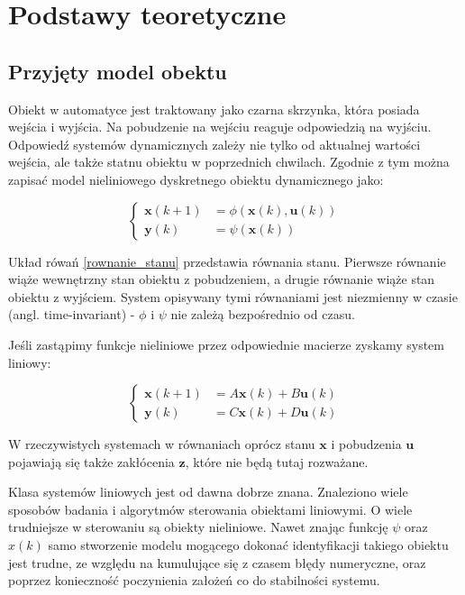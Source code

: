 \documentclass{article}
\newcommand{\bb}{\textbf}
\begin{document}
\section{Podstawy teoretyczne}

\subsection{Przyjęty model obektu}

Obiekt w automatyce jest traktowany jako czarna skrzynka, która posiada wejścia i wyjścia. Na pobudzenie na wejściu reaguje odpowiedzią na wyjściu. Odpowiedź systemów dynamicznych zależy nie tylko od aktualnej wartości wejścia, ale także statnu obiektu w poprzednich chwilach. Zgodnie z tym można zapisać model nieliniowego dyskretnego obiektu dynamicznego jako:

\begin{equation}
\left\{	
\begin{array}{ll}
	\bb{x}(k+1) &= \phi (\bb{x}(k), \bb{u}(k)) \\
	\bb{y}(k)   &= \psi (\bb{x}(k))
\end{array} \right.
\label{rownanie_stanu}
\end{equation}

Układ rówań \ref{rownanie_stanu} przedstawia równania stanu. Pierwsze równanie wiąże wewnętrzny stan obiektu z pobudzeniem, a drugie równanie wiąże stan obiektu z wyjściem. System opisywany tymi równaniami jest niezmienny w czasie (angl. time-invariant) - $\phi$ i $\psi$ nie zależą bezpośrednio od czasu. 

Jeśli zastąpimy funkcje nieliniowe przez odpowiednie macierze zyskamy system liniowy:

\begin{equation}
\left\{	
\begin{array}{ll}
	\bb{x}(k+1) &= A\bb{x}(k) + B\bb{u}(k) \\
	\bb{y}(k)   &= C\bb{x}(k) + D\bb{u}(k)
\end{array} \right.
\end{equation}

W rzeczywistych systemach w równaniach oprócz stanu $\bb{x}$ i pobudzenia $\bb{u}$ pojawiają się także zakłócenia $\bb{z}$, które nie będą tutaj rozważane.

Klasa systemów liniowych jest od dawna dobrze znana. Znaleziono wiele sposobów badania i algorytmów sterowania obiektami liniowymi. O wiele trudniejsze w sterowaniu są obiekty nieliniowe. Nawet znając funkcję $\psi$ oraz $x(k)$ samo stworzenie modelu mogącego dokonać identyfikacji takiego obiektu jest trudne, ze względu na kumulujące się z czasem błędy numeryczne, oraz poprzez konieczność poczynienia założeń co do stabilności systemu.
\end{document}
